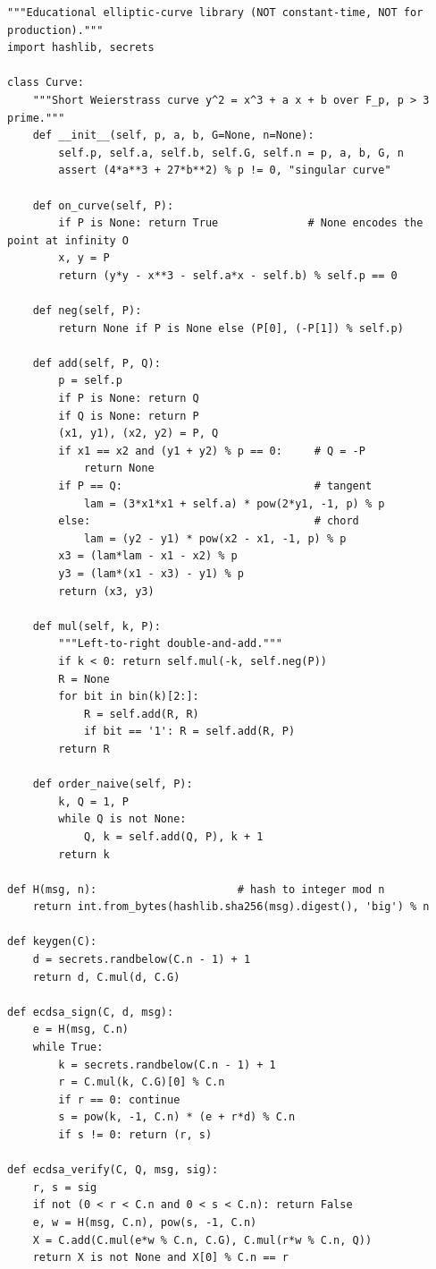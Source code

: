 \documentclass[11pt,a4paper,oneside]{book}
\theoremstyle{plain}
\theoremstyle{definition}
\theoremstyle{remark}
\begin{document}
\begin{lstlisting}[style=py]
"""Educational elliptic-curve library (NOT constant-time, NOT for production)."""
import hashlib, secrets

class Curve:
    """Short Weierstrass curve y^2 = x^3 + a x + b over F_p, p > 3 prime."""
    def __init__(self, p, a, b, G=None, n=None):
        self.p, self.a, self.b, self.G, self.n = p, a, b, G, n
        assert (4*a**3 + 27*b**2) % p != 0, "singular curve"

    def on_curve(self, P):
        if P is None: return True              # None encodes the point at infinity O
        x, y = P
        return (y*y - x**3 - self.a*x - self.b) % self.p == 0

    def neg(self, P):
        return None if P is None else (P[0], (-P[1]) % self.p)

    def add(self, P, Q):
        p = self.p
        if P is None: return Q
        if Q is None: return P
        (x1, y1), (x2, y2) = P, Q
        if x1 == x2 and (y1 + y2) % p == 0:     # Q = -P
            return None
        if P == Q:                              # tangent
            lam = (3*x1*x1 + self.a) * pow(2*y1, -1, p) % p
        else:                                   # chord
            lam = (y2 - y1) * pow(x2 - x1, -1, p) % p
        x3 = (lam*lam - x1 - x2) % p
        y3 = (lam*(x1 - x3) - y1) % p
        return (x3, y3)

    def mul(self, k, P):
        """Left-to-right double-and-add."""
        if k < 0: return self.mul(-k, self.neg(P))
        R = None
        for bit in bin(k)[2:]:
            R = self.add(R, R)
            if bit == '1': R = self.add(R, P)
        return R

    def order_naive(self, P):
        k, Q = 1, P
        while Q is not None:
            Q, k = self.add(Q, P), k + 1
        return k

def H(msg, n):                      # hash to integer mod n
    return int.from_bytes(hashlib.sha256(msg).digest(), 'big') % n

def keygen(C):
    d = secrets.randbelow(C.n - 1) + 1
    return d, C.mul(d, C.G)

def ecdsa_sign(C, d, msg):
    e = H(msg, C.n)
    while True:
        k = secrets.randbelow(C.n - 1) + 1
        r = C.mul(k, C.G)[0] % C.n
        if r == 0: continue
        s = pow(k, -1, C.n) * (e + r*d) % C.n
        if s != 0: return (r, s)

def ecdsa_verify(C, Q, msg, sig):
    r, s = sig
    if not (0 < r < C.n and 0 < s < C.n): return False
    e, w = H(msg, C.n), pow(s, -1, C.n)
    X = C.add(C.mul(e*w % C.n, C.G), C.mul(r*w % C.n, Q))
    return X is not None and X[0] % C.n == r


\end{lstlisting}
\end{document}
